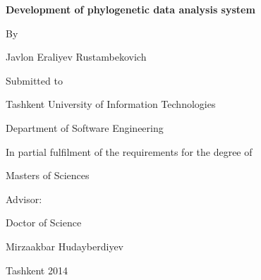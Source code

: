 \thispagestyle{empty}
\begin{center}
{\bf \large Development of phylogenetic data analysis system
\par}

\vspace{30mm}
\begin{center}
{\large By \par Javlon Eraliyev Rustambekovich}
\end{center} 
\vspace{5mm}
\begin{center}
Submitted to\par
Tashkent University of Information Technologies\par
Department of Software Engineering\par
\par
\end{center}

\vspace{30mm}
In partial fulfilment of the requirements for the degree of\par 
Masters of Sciences

\end{center}

\vspace{40mm}
\begin{flushright}
Advisor:

Doctor of Science

Mirzaakbar Hudayberdiyev

\end{flushright}

\vspace{40mm}
\begin{center}
{Tashkent 2014}
\end{center}

\newpage